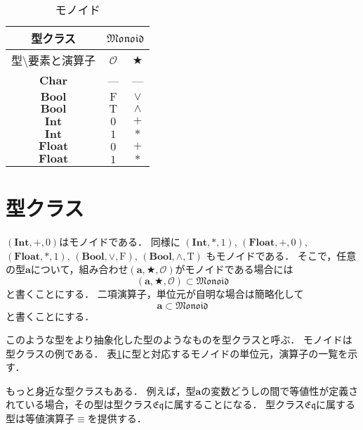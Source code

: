 \documentclass[twocolumn]{jsbook}
\newcommand{\typeclassname}[1]{\mathfrak{#1}}
\newcommand{\typeclasseq}{\typeclassname{Eq}}
\newcommand{\typeclassmonoid}{\typeclassname{Monoid}}
\newcommand{\typename}[1]{\mathbf{#1}}
\newcommand{\typebool}{\typename{Bool}}
\newcommand{\typechar}{\typename{Char}}
\newcommand{\typeint}{\typename{Int}}
\newcommand{\typefloat}{\typename{Float}}
\newcommand{\constantname}[1]{\mathrm{#1}}
\newcommand{\constanttrue}{\constantname{T}}
\newcommand{\constantfalse}{\constantname{F}}
\newcommand{\binaryeq}{\equiv}
\newcommand{\binaryadd}{+}
\newcommand{\binarymultiply}{*}
\newcommand{\binaryor}{\vee}
\newcommand{\binaryand}{\wedge}
\newcommand{\isclassof}{\subset}
\newcommand{\mathbinaryop}{\bigstar}
\newcommand{\mathidentity}{\mathcal{O}}
\newcommand{\mathtriple}[3]{(#1,#2,#3)}
\begin{document}
\begin{table}
\caption{モノイド}
\label{tab:monoids}
\begin{center}
\begin{tabular}{||c||c|c||}
\hline
型クラス
    &\multicolumn{2}{|c||}{$\typeclassmonoid$}\\
\hline\hline
型$\setminus$要素と演算子
    &$\mathidentity$
    &$\mathbinaryop$\\
\hline
$\typechar$
    &---
    &---\\
\hline
$\typebool$
    &$\constantfalse$
    &$\binaryor$\\
\hline
$\typebool$
    &$\constanttrue$
    &$\binaryand$\\
\hline
$\typeint$
    &$0$
    &$\binaryadd$\\
\hline
$\typeint$
    &$1$
    &$\binarymultiply$\\
\hline
$\typefloat$
    &$0$
    &$\binaryadd$\\
\hline
$\typefloat$
    &$1$
    &$\binarymultiply$\\
\hline
\end{tabular}
\end{center}
\end{table}

\section{型クラス}

$\mathtriple{\typeint}{+}{0}$はモノイドである．
同様に $\mathtriple{\typeint}{*}{1}$, $\mathtriple{\typefloat}{+}{0}$, $\mathtriple{\typefloat}{*}{1}$, $\mathtriple{\typebool}{\binaryor}{\constantfalse}$, $\mathtriple{\typebool}{\binaryand}{\constanttrue}$ もモノイドである．
そこで，任意の型$\typename{a}$について，組み合わせ$\mathtriple{\typename{a}}{\mathbinaryop}{\mathidentity}$がモノイドである場合には$$\mathtriple{\typename{a}}{\mathbinaryop}{\mathidentity}\isclassof\typeclassmonoid$$と書くことにする．
二項演算子，単位元が自明な場合は簡略化して$$\typename{a}\isclassof\typeclassmonoid$$と書くことにする．

このような型をより抽象化した型のようなものを型クラスと呼ぶ．
モノイドは型クラスの例である．
表\ref{tab:monoids}に型と対応するモノイドの単位元，演算子の一覧を示す．

もっと身近な型クラスもある．
例えば，型$\typename{a}$の変数どうしの間で等値性が定義されている場合，その型は型クラス$\typeclasseq$に属することになる．
型クラス$\typeclasseq$に属する型は等値演算子$\binaryeq$を提供する．
\end{document}
